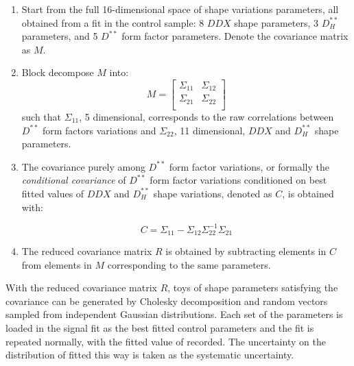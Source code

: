 \begin{enumerate}
    \item Start from the full 16-dimensional space of shape variations
        parameters, all obtained from a fit in the control sample:
        8 $DDX$ shape parameters,
        3 $D^{**}_H$ parameters,
        and 5 $D^{**}$ form factor parameters.
        Denote the covariance matrix as $M$.

    \item Block decompose $M$ into:
        \begin{equation}
            M =
            \begin{bmatrix}
                \Sigma_{11} &  \Sigma_{12} \\
                \Sigma_{21} &  \Sigma_{22} \\
            \end{bmatrix}
        \end{equation}
        such that $\Sigma_{11}$,
        5 dimensional,
        corresponds to the raw correlations between
        $D^{**}$ form factors variations and
        $\Sigma_{22}$, 11 dimensional,
        $DDX$ and $D^{**}_H$ shape parameters.

    \item The covariance purely among $D^{**}$ form factor variations,
        or formally the \emph{conditional covariance} of $D^{**}$ form factor
        variations conditioned on best fitted values of $DDX$ and $D^{**}_H$
        shape variations, denoted as $C$, is obtained with:

        \begin{equation}
            C = \Sigma_{11} - \Sigma_{12} \Sigma^{-1}_{22} \Sigma_{21}
        \end{equation}

    \item The reduced covariance matrix $R$ is obtained by
        subtracting elements in $C$ from elements in $M$ corresponding to the
        same parameters.
\end{enumerate}

With the reduced covariance matrix $R$, toys of shape parameters satisfying
the covariance can be generated by Cholesky decomposition and random vectors
sampled from independent Gaussian distributions.
Each set of the parameters is loaded in the signal fit as the best
fitted control parameters and the fit is repeated normally,
with the fitted value of \RDX recorded.
The uncertainty on the distribution of \RDX fitted this way is taken as the
systematic uncertainty.


